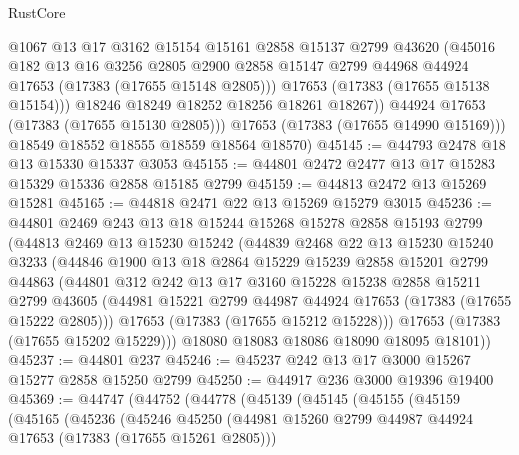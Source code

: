 \begin{lexlean}{RustCore}
\begin{coremodule}
                @1067
                @13
                @17
                @3162
                @15154
                @15161
                @2858
                @15137
                @2799
                @43620
                (@45016
                  @182
                  @13
                  @16
                  @3256
                  @2805
                  @2900
                  @2858
                  @15147
                  @2799
                  @44968
                  @44924
                  @17653
                  (@17383 (@17655 @15148 @2805)))
                @17653
                (@17383 (@17655 @15138 @15154)))
              @18246
              @18249
              @18252
              @18256
              @18261
              @18267))
          @44924
          @17653
          (@17383 (@17655 @15130 @2805)))
        @17653
        (@17383 (@17655 @14990 @15169)))
      @18549
      @18552
      @18555
      @18559
      @18564
      @18570)
@45145 := @44793 @2478 @18 @13 @15330 @15337 @3053
@45155 := @44801 @2472 @2477 @13 @17 @15283 @15329 @15336 @2858 @15185 @2799
@45159 := @44813 @2472 @13 @15269 @15281
@45165 := @44818 @2471 @22 @13 @15269 @15279 @3015
@45236 := @44801
    @2469
    @243
    @13
    @18
    @15244
    @15268
    @15278
    @2858
    @15193
    @2799
    (@44813
      @2469
      @13
      @15230
      @15242
      (@44839
        @2468
        @22
        @13
        @15230
        @15240
        @3233
        (@44846
          @1900
          @13
          @18
          @2864
          @15229
          @15239
          @2858
          @15201
          @2799
          @44863
          (@44801
            @312
            @242
            @13
            @17
            @3160
            @15228
            @15238
            @2858
            @15211
            @2799
            @43605
            (@44981 @15221 @2799 @44987 @44924 @17653 (@17383 (@17655 @15222 @2805)))
            @17653
            (@17383 (@17655 @15212 @15228)))
          @17653
          (@17383 (@17655 @15202 @15229)))
        @18080
        @18083
        @18086
        @18090
        @18095
        @18101))
@45237 := @44801 @237
@45246 := @45237 @242 @13 @17 @3000 @15267 @15277 @2858 @15250 @2799
@45250 := @44917 @236 @3000 @19396 @19400
@45369 := @44747
    (@44752
      (@44778
        (@45139
          (@45145
            (@45155
              (@45159
                (@45165
                  (@45236
                    (@45246
                      @45250
                      (@44981 @15260 @2799 @44987 @44924 @17653 (@17383 (@17655 @15261 @2805)))

\end{coremodule}
\end{lexlean}
